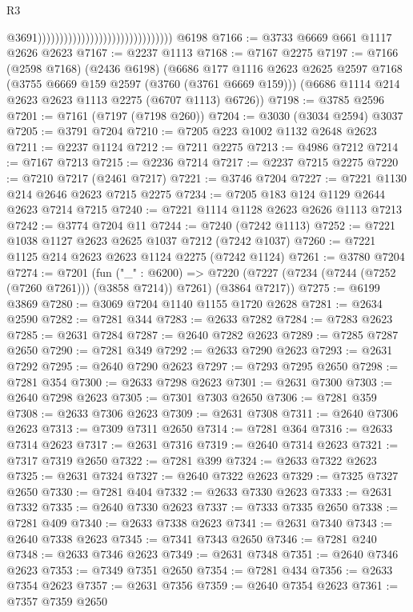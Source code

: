 \begin{lexlean}{R3}
\begin{coremodule}
                                                                  @3691)))))))))))))))))))))))))))))))
    @6198
@7166 := @3733 @6669 @661 @1117 @2626 @2623
@7167 := @2237 @1113
@7168 := @7167 @2275
@7197 := @7166
    (@2598 @7168)
    (@2436 @6198)
    (@6686
      @177
      @1116
      @2623
      @2625
      @2597
      @7168
      (@3755 @6669 @159 @2597 (@3760 (@3761 @6669 @159)))
      (@6686 @1114 @214 @2623 @2623 @1113 @2275 (@6707 @1113) @6726))
@7198 := @3785 @2596
@7201 := @7161 (@7197 (@7198 @260))
@7204 := @3030 (@3034 @2594) @3037
@7205 := @3791 @7204
@7210 := @7205 @223 @1002 @1132 @2648 @2623
@7211 := @2237 @1124
@7212 := @7211 @2275
@7213 := @4986 @7212
@7214 := @7167 @7213
@7215 := @2236 @7214
@7217 := @2237 @7215 @2275
@7220 := @7210 @7217 (@2461 @7217)
@7221 := @3746 @7204
@7227 := @7221 @1130 @214 @2646 @2623 @7215 @2275
@7234 := @7205 @183 @124 @1129 @2644 @2623 @7214 @7215
@7240 := @7221 @1114 @1128 @2623 @2626 @1113 @7213
@7242 := @3774 @7204 @11
@7244 := @7240 (@7242 @1113)
@7252 := @7221 @1038 @1127 @2623 @2625 @1037 @7212 (@7242 @1037)
@7260 := @7221 @1125 @214 @2623 @2623 @1124 @2275 (@7242 @1124)
@7261 := @3780 @7204
@7274 := @7201
    (fun ("_" : @6200) =>
    @7220 (@7227 (@7234 (@7244 (@7252 (@7260 @7261))) (@3858 @7214)) @7261) (@3864 @7217))
@7275 := @6199 @3869
@7280 := @3069 @7204 @1140 @1155 @1720 @2628
@7281 := @2634 @2590
@7282 := @7281 @344
@7283 := @2633 @7282
@7284 := @7283 @2623
@7285 := @2631 @7284
@7287 := @2640 @7282 @2623
@7289 := @7285 @7287 @2650
@7290 := @7281 @349
@7292 := @2633 @7290 @2623
@7293 := @2631 @7292
@7295 := @2640 @7290 @2623
@7297 := @7293 @7295 @2650
@7298 := @7281 @354
@7300 := @2633 @7298 @2623
@7301 := @2631 @7300
@7303 := @2640 @7298 @2623
@7305 := @7301 @7303 @2650
@7306 := @7281 @359
@7308 := @2633 @7306 @2623
@7309 := @2631 @7308
@7311 := @2640 @7306 @2623
@7313 := @7309 @7311 @2650
@7314 := @7281 @364
@7316 := @2633 @7314 @2623
@7317 := @2631 @7316
@7319 := @2640 @7314 @2623
@7321 := @7317 @7319 @2650
@7322 := @7281 @399
@7324 := @2633 @7322 @2623
@7325 := @2631 @7324
@7327 := @2640 @7322 @2623
@7329 := @7325 @7327 @2650
@7330 := @7281 @404
@7332 := @2633 @7330 @2623
@7333 := @2631 @7332
@7335 := @2640 @7330 @2623
@7337 := @7333 @7335 @2650
@7338 := @7281 @409
@7340 := @2633 @7338 @2623
@7341 := @2631 @7340
@7343 := @2640 @7338 @2623
@7345 := @7341 @7343 @2650
@7346 := @7281 @240
@7348 := @2633 @7346 @2623
@7349 := @2631 @7348
@7351 := @2640 @7346 @2623
@7353 := @7349 @7351 @2650
@7354 := @7281 @434
@7356 := @2633 @7354 @2623
@7357 := @2631 @7356
@7359 := @2640 @7354 @2623
@7361 := @7357 @7359 @2650

\end{coremodule}
\end{lexlean}
